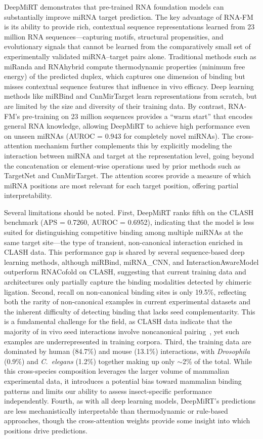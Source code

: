 \documentclass[10pt,a4paper]{article}
\begin{document}
DeepMiRT demonstrates that pre-trained RNA foundation models can substantially improve miRNA target prediction. The key advantage of RNA-FM is its ability to provide rich, contextual sequence representations learned from 23 million RNA sequences---capturing motifs, structural propensities, and evolutionary signals that cannot be learned from the comparatively small set of experimentally validated miRNA--target pairs alone. Traditional methods such as miRanda and RNAhybrid compute thermodynamic properties (minimum free energy) of the predicted duplex, which captures one dimension of binding but misses contextual sequence features that influence in vivo efficacy. Deep learning methods like miRBind and CnnMirTarget learn representations from scratch, but are limited by the size and diversity of their training data. By contrast, RNA-FM's pre-training on 23 million sequences provides a ``warm start'' that encodes general RNA knowledge, allowing DeepMiRT to achieve high performance even on unseen miRNAs (AUROC = 0.943 for completely novel miRNAs). The cross-attention mechanism further complements this by explicitly modeling the interaction between miRNA and target at the representation level, going beyond the concatenation or element-wise operations used by prior methods such as TargetNet and CnnMirTarget. The attention scores provide a measure of which miRNA positions are most relevant for each target position, offering partial interpretability.

Several limitations should be noted. First, DeepMiRT ranks fifth on the CLASH benchmark (APS = 0.7260, AUROC = 0.6952), indicating that the model is less suited for distinguishing competitive binding among multiple miRNAs at the same target site---the type of transient, non-canonical interaction enriched in CLASH data. This performance gap is shared by several sequence-based deep learning methods, although miRBind, miRNA\_CNN, and InteractionAwareModel outperform RNACofold on CLASH, suggesting that current training data and architectures only partially capture the binding modalities detected by chimeric ligation. Second, recall on non-canonical binding sites is only 19.5\%, reflecting both the rarity of non-canonical examples in current experimental datasets and the inherent difficulty of detecting binding that lacks seed complementarity. This is a fundamental challenge for the field, as CLASH data indicate that the majority of in vivo seed interactions involve noncanonical pairing~\citep{helwak2013clash}, yet such examples are underrepresented in training corpora. Third, the training data are dominated by human (84.7\%) and mouse (13.1\%) interactions, with \textit{Drosophila} (0.9\%) and \textit{C.\ elegans} (1.2\%) together making up only $\sim$2\% of the total. While this cross-species composition leverages the larger volume of mammalian experimental data, it introduces a potential bias toward mammalian binding patterns and limits our ability to assess insect-specific performance independently. Fourth, as with all deep learning models, DeepMiRT's predictions are less mechanistically interpretable than thermodynamic or rule-based approaches, though the cross-attention weights provide some insight into which positions drive predictions.
\end{document}
